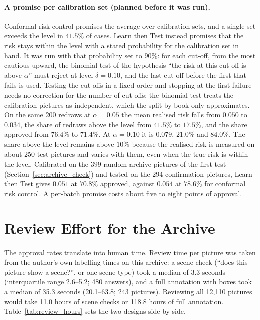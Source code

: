 \paragraph{A promise per calibration set (planned before it was run).} Conformal risk control promises the average over calibration sets, and a single set exceeds the level in $41.5\%$ of cases. Learn then Test \cite{angelopoulos2021ltt} instead promises that the risk stays within the level with a stated probability for the calibration set in hand. It was run with that probability set to $90\%$: for each cut-off, from the most cautious upward, the binomial test of the hypothesis ``the risk at this cut-off is above $\alpha$'' must reject at level $\delta = 0.10$, and the last cut-off before the first that fails is used. Testing the cut-offs in a fixed order and stopping at the first failure needs no correction for the number of cut-offs; the binomial test treats the calibration pictures as independent, which the split by book only approximates. On the same 200 redraws at $\alpha=0.05$ the mean realised risk falls from $0.050$ to $0.034$, the share of redraws above the level from $41.5\%$ to $17.5\%$, and the share approved from $76.4\%$ to $71.4\%$. At $\alpha = 0.10$ it is $0.079$, $21.0\%$ and $84.0\%$. The share above the level remains above $10\%$ because the realised risk is measured on about 250 test pictures and varies with them, even when the true risk is within the level. Calibrated on the $399$ random archive pictures of the first test (Section~\ref{sec:archive_check}) and tested on the $294$ confirmation pictures, Learn then Test gives $0.051$ at $70.8\%$ approved, against $0.054$ at $78.6\%$ for conformal risk control. A per-batch promise costs about five to eight points of approval.

\section{Review Effort for the Archive}
\label{sec:review_hours}

The approval rates translate into human time. Review time per picture was taken from the author's own labelling times on this archive: a scene check (``does this picture show a scene?'', or one scene type) took a median of 3.3 seconds (interquartile range 2.6--5.2; 480 answers), and a full annotation with boxes took a median of 35.3 seconds (20.1--63.8; 243 pictures). Reviewing all 12,110 pictures would take 11.0 hours of scene checks or 118.8 hours of full annotation. Table~\ref{tab:review_hours} sets the two designs side by side.

